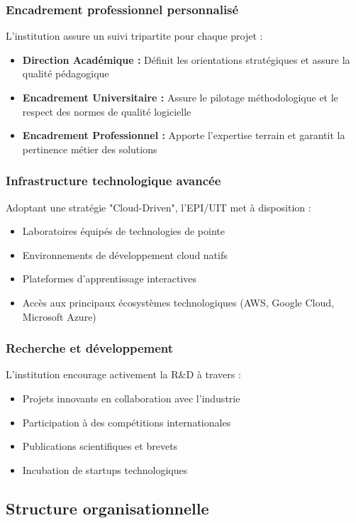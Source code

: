 \subsubsection{Encadrement professionnel personnalisé}
L'institution assure un suivi tripartite pour chaque projet :
\begin{itemize}
    \item \textbf{Direction Académique :} Définit les orientations stratégiques et assure la qualité pédagogique
    \item \textbf{Encadrement Universitaire :} Assure le pilotage méthodologique et le respect des normes de qualité logicielle
    \item \textbf{Encadrement Professionnel :} Apporte l'expertise terrain et garantit la pertinence métier des solutions
\end{itemize}

\subsubsection{Infrastructure technologique avancée}
Adoptant une stratégie "Cloud-Driven", l'EPI/UIT met à disposition :
\begin{itemize}
    \item Laboratoires équipés de technologies de pointe
    \item Environnements de développement cloud natifs
    \item Plateformes d'apprentissage interactives
    \item Accès aux principaux écosystèmes technologiques (AWS, Google Cloud, Microsoft Azure)
\end{itemize}

\subsubsection{Recherche et développement}
L'institution encourage activement la R\&D à travers :
\begin{itemize}
    \item Projets innovants en collaboration avec l'industrie
    \item Participation à des compétitions internationales
    \item Publications scientifiques et brevets
    \item Incubation de startups technologiques
\end{itemize}

\subsection{Structure organisationnelle}

